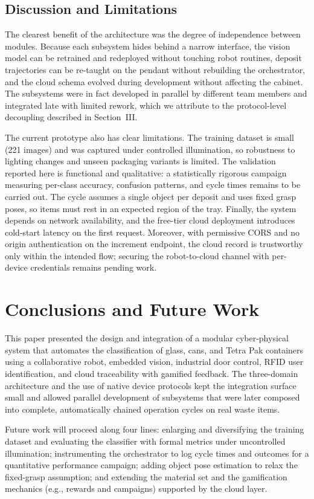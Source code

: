 \documentclass[conference]{IEEEtran}
\begin{document}
\subsection{Discussion and Limitations}
The clearest benefit of the architecture was the degree of independence between modules. Because each subsystem hides behind a narrow interface, the vision model can be retrained and redeployed without touching robot routines, deposit trajectories can be re-taught on the pendant without rebuilding the orchestrator, and the cloud schema evolved during development without affecting the cabinet. The subsystems were in fact developed in parallel by different team members and integrated late with limited rework, which we attribute to the protocol-level decoupling described in Section~III.

The current prototype also has clear limitations. The training dataset is small (221 images) and was captured under controlled illumination, so robustness to lighting changes and unseen packaging variants is limited. The validation reported here is functional and qualitative: a statistically rigorous campaign measuring per-class accuracy, confusion patterns, and cycle times remains to be carried out. The cycle assumes a single object per deposit and uses fixed grasp poses, so items must rest in an expected region of the tray. Finally, the system depends on network availability, and the free-tier cloud deployment introduces cold-start latency on the first request. Moreover, with permissive CORS and no origin authentication on the increment endpoint, the cloud record is trustworthy only within the intended flow; securing the robot-to-cloud channel with per-device credentials remains pending work.

\section{Conclusions and Future Work}
This paper presented the design and integration of a modular cyber-physical system that automates the classification of glass, cans, and Tetra Pak containers using a collaborative robot, embedded vision, industrial door control, RFID user identification, and cloud traceability with gamified feedback. The three-domain architecture and the use of native device protocols kept the integration surface small and allowed parallel development of subsystems that were later composed into complete, automatically chained operation cycles on real waste items.

Future work will proceed along four lines: enlarging and diversifying the training dataset and evaluating the classifier with formal metrics under uncontrolled illumination; instrumenting the orchestrator to log cycle times and outcomes for a quantitative performance campaign; adding object pose estimation to relax the fixed-grasp assumption; and extending the material set and the gamification mechanics (e.g., rewards and campaigns) supported by the cloud layer.
\end{document}
